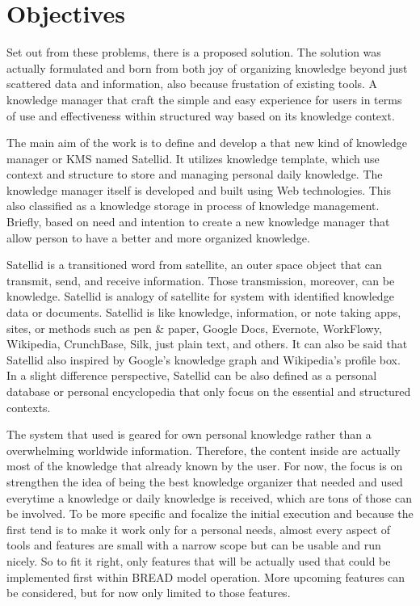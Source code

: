 \section{Objectives}
\label{sec:objectives}

Set out from these problems, there is a proposed solution.
The solution was actually formulated and born from both joy of organizing knowledge beyond just scattered data and information, also because frustation of existing tools.
A knowledge manager that craft the simple and easy experience for users in terms of use and effectiveness within structured way based on its knowledge context.

The main aim of the work is to define and develop a that new kind of knowledge manager or \ac{KMS} named Satellid.
It utilizes knowledge template, which use context and structure to store and managing personal daily knowledge.
The knowledge manager itself is developed and built using Web technologies.
This also classified as a knowledge storage in process of knowledge management.
Briefly, based on need and intention to create a new knowledge manager that allow person to have a better and more organized knowledge.

Satellid is a transitioned word from satellite, an outer space object that can transmit, send, and receive information.
Those transmission, moreover, can be knowledge.
Satellid is analogy of satellite for system with identified knowledge data or documents.
Satellid is like knowledge, information, or note taking apps, sites, or methods such as pen \& paper, Google Docs, Evernote, WorkFlowy, Wikipedia, CrunchBase, Silk, just plain text, and others.
It can also be said that Satellid also inspired by Google's knowledge graph and Wikipedia's profile box.
In a slight difference perspective, Satellid can be also defined as a personal database or personal encyclopedia that only focus on the essential and structured contexts.

The system that used is geared for own personal knowledge rather than a overwhelming worldwide information.
Therefore, the content inside are actually most of the knowledge that already known by the user.
For now, the focus is on strengthen the idea of being the best knowledge organizer that needed and used everytime a knowledge or daily knowledge is received, which are tons of those can be involved.
To be more specific and focalize the initial execution and because the first tend is to make it work only for a personal needs, almost every aspect of tools and features are small with a narrow scope but can be usable and run nicely.
So to fit it right, only features that will be actually used that could be implemented first within \ac{BREAD} model operation.
More upcoming features can be considered, but for now only limited to those features.

